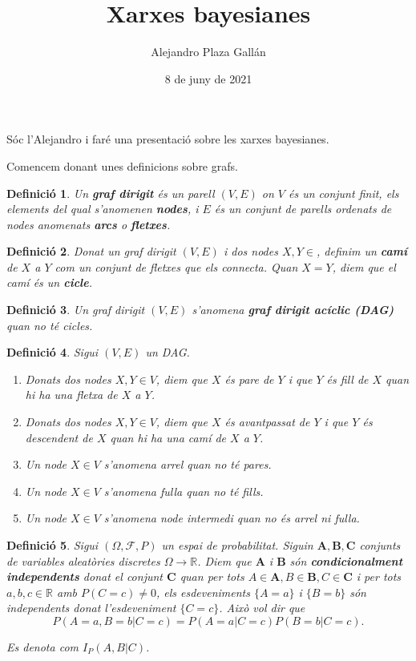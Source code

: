 \documentclass{article}
\title{Xarxes bayesianes}
\author{Alejandro Plaza Gall\'{a}n}
\date{8 de juny de 2021}
\newtheorem{definicio}{Definici\'{o}}
\theoremstyle{definition}
\begin{document}
\maketitle

S\'{o}c l'Alejandro i far\'{e} una presentaci\'{o} sobre les xarxes bayesianes.

Comencem donant unes definicions sobre grafs.

\begin{definicio}
Un \textbf{graf dirigit} \'{e}s un parell $(V,E)$ on $V$ \'{e}s un conjunt finit, els elements del qual s'anomenen \textbf{nodes}, i $E$ \'{e}s un conjunt de parells ordenats de nodes anomenats \textbf{arcs} o \textbf{fletxes}.
\end{definicio}

\begin{definicio}
Donat un graf dirigit $(V,E)$ i dos nodes $X,Y\in$, definim un \textbf{cam\'{i}} de $X$ a $Y$ com un conjunt de fletxes que els connecta. Quan $X=Y$, diem que el cam\'{i} \'{e}s un \textbf{cicle}.
\end{definicio}

\begin{definicio}
Un graf dirigit $(V,E)$ s'anomena \textbf{graf dirigit ac\'{i}clic (DAG)} quan no t\'{e} cicles.
\end{definicio}

\begin{definicio}
Sigui $(V,E)$ un DAG.
\begin{enumerate}
\item Donats dos nodes $X,Y\in V$, diem que $X$ \'{e}s pare de $Y$ i que $Y$ \'{e}s fill de $X$ quan hi ha una fletxa de $X$ a $Y$.
\item Donats dos nodes $X,Y\in V$, diem que $X$ \'{e}s avantpassat de $Y$ i que $Y$ \'{e}s descendent de $X$ quan hi ha una cam\'{i} de $X$ a $Y$.
\item Un node $X\in V$ s'anomena arrel quan no t\'{e} pares.
\item Un node $X\in V$ s'anomena fulla quan no t\'{e} fills.
\item Un node $X\in V$ s'anomena node intermedi quan no \'{e}s arrel ni fulla.
\end{enumerate}
\end{definicio}

\begin{definicio}
Sigui $(\Omega,\mathcal{F},P)$ un espai de probabilitat. Siguin $\boldsymbol{A},\boldsymbol{B},\boldsymbol{C}$ conjunts de variables aleat\`{o}ries discretes $\Omega\rightarrow\mathbb{R}$. Diem que $\boldsymbol{A}$ i $\boldsymbol{B}$ s\'{o}n \textbf{condicionalment independents} donat el conjunt $\boldsymbol{C}$ quan per tots $A\in\boldsymbol{A},B\in\boldsymbol{B},C\in\boldsymbol{C}$ i per tots $a,b,c\in\mathbb{R}$ amb $P(C=c)\neq0$, els esdeveniments $\{A=a\}$ i $\{B=b\}$ s\'{o}n independents donat l'esdeveniment $\{C=c\}$. Aix\`{o} vol dir que
\[P(A=a,B=b|C=c)=P(A=a|C=c)P(B=b|C=c).\]

Es denota com $I_P(A,B|C)$.
\end{definicio}
\end{document}
